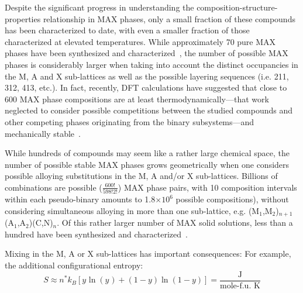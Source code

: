 \documentclass[preprint,amsmath,amssymb,aps, prb,showkeys]{revtex4-1}
\begin{document}
Despite the significant progress in understanding the composition-structure-properties relationship in MAX phases, only a small fraction of these compounds has been characterized to date, with even a smaller fraction of those characterized at elevated temperatures. While approximately 70 pure MAX phases have been synthesized and characterized~\cite{barsoum2010max}, the number of possible MAX phases is considerably larger when taking into account the distinct occupancies in the M, A and X sub-lattices as well as the possible layering sequences (i.e. 211, 312, 413, etc.). In fact, recently, DFT calculations have suggested that close to 600 MAX phase compositions are at least thermodynamically---that work neglected to consider possible competitions between the studied compounds and other competing phases originating from the binary subsystems---and mechanically stable~\cite{aryal2014genomic}. 

While hundreds of compounds may seem like a rather large chemical space, the number of possible stable MAX phases grows geometrically when one considers possible alloying substitutions in the M, A and/or X sub-lattices. Billions of combinations are possible ($\frac{600!}{598!2!}$) MAX phase pairs, with 10 composition intervals within each pseudo-binary amounts to 1.8$\times10^6$ possible compositions), without considering simultaneous alloying in more than one sub-lattice, e.g. (M$_1$,M$_2$)$_{n+1}$(A$_1$,A$_2$)(C,N)$_n$. Of this rather larger number of MAX solid solutions, less than a hundred have been synthesized and characterized~\cite{naguib2014new}. 

Mixing in the M, A or X sub-lattices has important consequences: For example, the additional configurational entropy:
\begin{equation}
 S\approx n^{*} k_B \left[ y^{} \ln\left(y^{}\right) + \left(1-y\right)\ln\left(1-y\right) \right] = \frac{\text{J}}{\text{mole-f.u. K}}
 \label{eq:mixing}
\end{equation}
\end{document}
